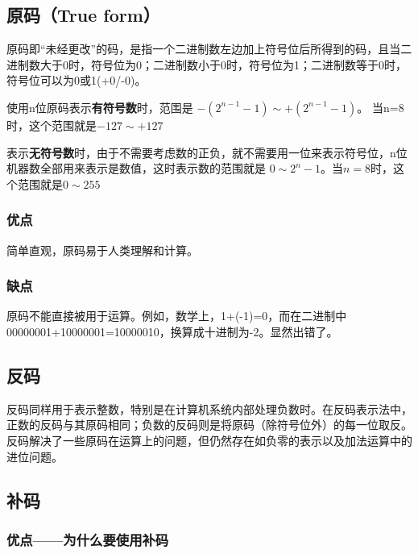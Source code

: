 \begin{issues}
\issueDraft
\end{issues}


\subsection{原码（True form）}

原码即“未经更改”的码，是指一个二进制数左边加上符号位后所得到的码，且当二进制数大于0时，符号位为0；二进制数小于0时，符号位为1；二进制数等于0时，符号位可以为0或1(+0/-0)。

使用n位原码表示\textbf{有符号数}时，范围是 $-(2^{n-1}-1)\sim +(2^{n-1}-1)$。 当n=8时，这个范围就是$-127\sim +127 $

表示\textbf{无符号数}时，由于不需要考虑数的正负，就不需要用一位来表示符号位，n位机器数全部用来表示是数值，这时表示数的范围就是
$0\sim 2^{n}-1$。当$n=8$时，这个范围就是$0\sim 255$

\subsubsection{优点}

简单直观，原码易于人类理解和计算。

\subsubsection{缺点}
原码不能直接被用于运算。例如，数学上，1+(-1)=0，而在二进制中00000001+10000001=10000010，换算成十进制为-2。显然出错了。

\subsection{反码}

反码同样用于表示整数，特别是在计算机系统内部处理负数时。在反码表示法中，正数的反码与其原码相同；负数的反码则是将原码（除符号位外）的每一位取反。反码解决了一些原码在运算上的问题，但仍然存在如负零的表示以及加法运算中的进位问题。

\subsection{补码}

\subsubsection{优点——为什么要使用补码}






